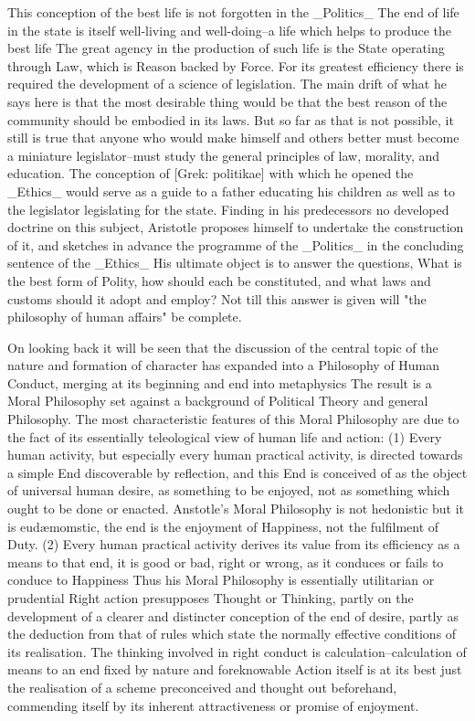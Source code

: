 This conception of the best life is not forgotten in the _Politics_ The
end of life in the state is itself well-living and well-doing--a life
which helps to produce the best life The great agency in the production
of such life is the State operating through Law, which is Reason backed
by Force. For its greatest efficiency there is required the development
of a science of legislation. The main drift of what he says here is that
the most desirable thing would be that the best reason of the community
should be embodied in its laws. But so far as that is not possible, it
still is true that anyone who would make himself and others better must
become a miniature legislator--must study the general principles of law,
morality, and education. The conception of [Grek: politikae] with which
he opened the _Ethics_ would serve as a guide to a father educating his
children as well as to the legislator legislating for the state. Finding
in his predecessors no developed doctrine on this subject, Aristotle
proposes himself to undertake the construction of it, and sketches in
advance the programme of the _Politics_ in the concluding sentence of
the _Ethics_ His ultimate object is to answer the questions, What is the
best form of Polity, how should each be constituted, and what laws and
customs should it adopt and employ? Not till this answer is given will
"the philosophy of human affairs" be complete.

On looking back it will be seen that the discussion of the central topic
of the nature and formation of character has expanded into a Philosophy
of Human Conduct, merging at its beginning and end into metaphysics
The result is a Moral Philosophy set against a background of Political
Theory and general Philosophy. The most characteristic features of this
Moral Philosophy are due to the fact of its essentially teleological
view of human life and action: (1) Every human activity, but especially
every human practical activity, is directed towards a simple End
discoverable by reflection, and this End is conceived of as the object
of universal human desire, as something to be enjoyed, not as something
which ought to be done or enacted. Anstotle's Moral Philosophy is not
hedonistic but it is eudæmomstic, the end is the enjoyment of Happiness,
not the fulfilment of Duty. (2) Every human practical activity derives
its value from its efficiency as a means to that end, it is good or bad,
right or wrong, as it conduces or fails to conduce to Happiness Thus his
Moral Philosophy is essentially utilitarian or prudential Right action
presupposes Thought or Thinking, partly on the development of a clearer
and distincter conception of the end of desire, partly as the deduction
from that of rules which state the normally effective conditions of
its realisation. The thinking involved in right conduct is
calculation--calculation of means to an end fixed by nature and
foreknowable Action itself is at its best just the realisation of a
scheme preconceived and thought out beforehand, commending itself by its
inherent attractiveness or promise of enjoyment.

